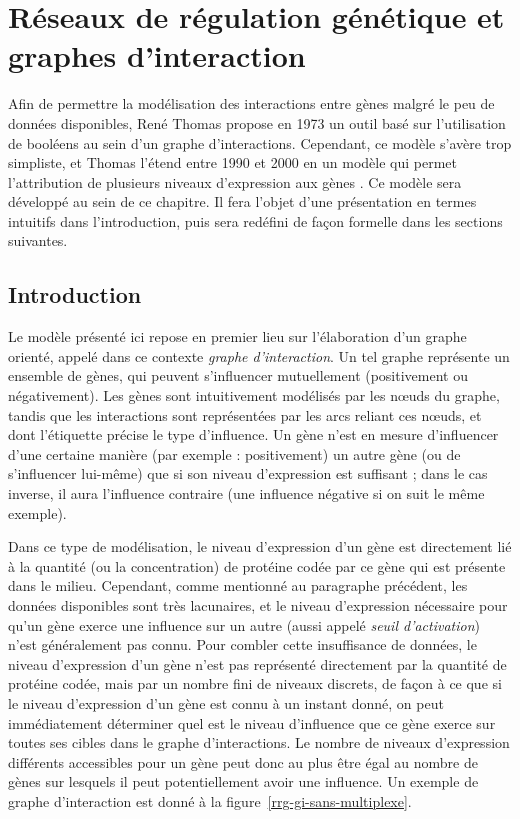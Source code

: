 \chapter{Réseaux de régulation génétique et graphes d'interaction}
\label{rrg}
Afin de permettre la modélisation des interactions entre gènes malgré le peu de données disponibles, René Thomas propose en 1973 un outil basé sur l'utilisation de booléens au sein d'un graphe d'interactions. Cependant, ce modèle s'avère trop simpliste, et Thomas l'étend entre 1990 et 2000 en un modèle qui permet l'attribution de plusieurs niveaux d'expression aux gènes \cite{richard-comet-bernot-08}. Ce modèle sera développé au sein de ce chapitre. Il fera l'objet d'une présentation en termes intuitifs dans l'introduction, puis sera redéfini de façon formelle dans les sections suivantes.

\section{Introduction}
Le modèle présenté ici repose en premier lieu sur l'élaboration d'un graphe orienté, appelé dans ce contexte \emph{graphe d'interaction}. Un tel graphe représente un ensemble de gènes, qui peuvent s'influencer mutuellement (positivement ou négativement). Les gènes sont intuitivement modélisés par les n\oe uds du graphe, tandis que les interactions sont représentées par les arcs reliant ces n\oe uds, et dont l'étiquette précise le type d'influence. Un gène n'est en mesure d'influencer d'une certaine manière (par exemple : positivement) un autre gène (ou de s'influencer lui-même) que si son niveau d'expression est suffisant ; dans le cas inverse, il aura l'influence contraire (une influence négative si on suit le même exemple).

Dans ce type de modélisation, le niveau d'expression d'un gène est directement lié à la quantité (ou la concentration) de protéine codée par ce gène qui est présente dans le milieu. Cependant, comme mentionné au paragraphe précédent, les données disponibles sont très lacunaires, et le niveau d'expression nécessaire pour qu'un gène exerce une influence sur un autre (aussi appelé \emph{seuil d'activation}) n'est généralement pas connu. Pour combler cette insuffisance de données, le niveau d'expression d'un gène n'est pas représenté directement par la quantité de protéine codée, mais par un nombre fini de niveaux discrets, de façon à ce que si le niveau d'expression d'un gène est connu à un instant donné, on peut immédiatement déterminer quel est le niveau d'influence que ce gène exerce sur toutes ses cibles dans le graphe d'interactions. Le nombre de niveaux d'expression différents accessibles pour un gène peut donc au plus être égal au nombre de gènes sur lesquels il peut potentiellement avoir une influence. Un exemple de graphe d'interaction est donné à la figure~\ref{rrg-gi-sans-multiplexe}.\\

